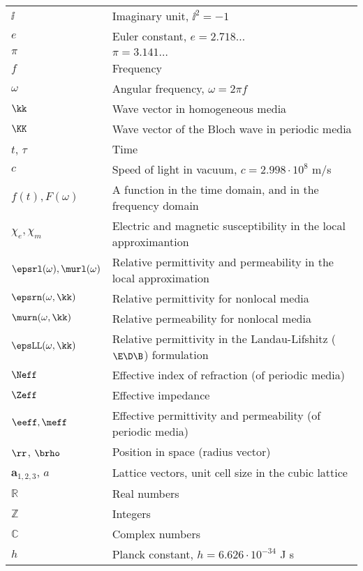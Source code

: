 \begin{table}[ht]
\begin{tabular}{ll}
$\ii$		& Imaginary unit, $\ii^2 = -1$\\
$e$ 		& Euler constant, $e = 2.718\ldots$\\
$\pi$ 		& $\pi = 3.141\ldots$\\
$f$			& Frequency\\
$\omega$ 	& Angular frequency, $\omega = 2\pi f$\\
$\kk$ 		& Wave vector in homogeneous media\\
$\KK$ 		& Wave vector of the Bloch wave in periodic media\\
$t$, $\tau$ 		& Time\\
$c$ 		& Speed of light in vacuum, $c=2.998\cdot 10^8$ m/s \\
$f(t), F(\omega)$ & A function in the time domain, and in the frequency domain \\
$\chi_e,\chi_m$	& Electric and magnetic susceptibility in the local approximantion \\
$\epsrl(\omega), \murl(\omega)$ &Relative permittivity and permeability in the local approximation\\
$\epsrn(\omega, \kk)$ &Relative permittivity for nonlocal media\\
$\murn(\omega, \kk)$ &Relative permeability for nonlocal media\\
$\epsLL(\omega, \kk)$ &Relative permittivity in the Landau-Lifshitz ($\E\D\B$) formulation\\
$\Neff$ 	& Effective index of refraction (of periodic media)\\
$\Zeff$ 	& Effective impedance\\
$\eeff, \meff$ 	& Effective permittivity and permeability (of periodic media)\\
$\rr$, $\brho$ 		& Position in space (radius vector)\\
$\mathbf{a}_{1,2,3}$, $a$ 		& Lattice vectors, unit cell size in the cubic lattice \\
$\mathbb{R}$		& Real numbers\\
$\mathbb{Z}$		& Integers\\
$\mathbb{C}$		& Complex numbers\\
$h$ 		& Planck constant, $h = 6.626\cdot 10^{-34}$ J s\\

 \bottomrule
 \end{tabular} \end{table}



